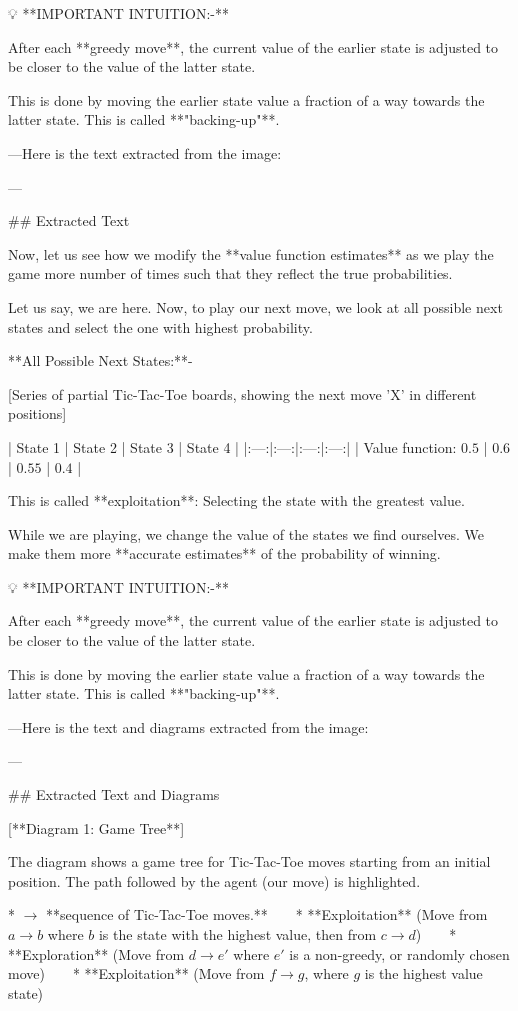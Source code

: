 💡 **IMPORTANT INTUITION:-**

After each **greedy move**, the current value of the earlier state is adjusted to be closer to the value of the latter state.

This is done by moving the earlier state value a fraction of a way towards the latter state. This is called **"backing-up"**.

---Here is the text extracted from the image:

---

## Extracted Text

Now, let us see how we modify the **value function estimates** as we play the game more number of times such that they reflect the true probabilities.


Let us say, we are here. Now, to play our next move, we look at all possible next states and select the one with highest probability.

**All Possible Next States:**-

[Series of partial Tic-Tac-Toe boards, showing the next move 'X' in different positions]

| State 1 | State 2 | State 3 | State 4 |
|:---:|:---:|:---:|:---:|
| Value function: $\text{0.5}$ | $\text{0.6}$ | $\text{0.55}$ | $\text{0.4}$ |

This is called **exploitation**: Selecting the state with the greatest value.

While we are playing, we change the value of the states we find ourselves. We make them more **accurate estimates** of the probability of winning.

💡 **IMPORTANT INTUITION:-**

After each **greedy move**, the current value of the earlier state is adjusted to be closer to the value of the latter state.

This is done by moving the earlier state value a fraction of a way towards the latter state. This is called **"backing-up"**.

---Here is the text and diagrams extracted from the image:

---

## Extracted Text and Diagrams

[**Diagram 1: Game Tree**]

The diagram shows a game tree for Tic-Tac-Toe moves starting from an initial position. The path followed by the agent (our move) is highlighted.

* $\to$ **sequence of Tic-Tac-Toe moves.**
    * **Exploitation** (Move from $a \to b$ where $b$ is the state with the highest value, then from $c \to d$)
    * **Exploration** (Move from $d \to e'$ where $e'$ is a non-greedy, or randomly chosen move)
    * **Exploitation** (Move from $f \to g$, where $g$ is the highest value state)

